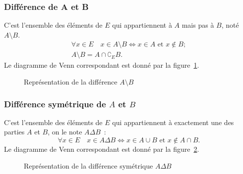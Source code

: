 \subsubsection{Différence de A et B}
\label{chap3-subsubsec:difference}
C'est l'ensemble des éléments de \(E\) qui appartiennent à \(A\) mais pas à 
\(B\), noté \(A \setminus B\).
\begin{gather}
    \forall x \in E \quad x \in A \setminus B \iff x \in A \text{~et~} x \not\in B; \\
    A \setminus B=A \cap \complement_E B.
\end{gather}
Le diagramme de Venn correspondant est donné par la figure~\ref{chap3-fig:diff}.

\begin{figure}
    \centering
    \caption{Représentation de la différence \(A \setminus B\)}
    \label{chap3-fig:diff}
\end{figure}

\subsubsection{Différence symétrique de \(A\) et \(B\)}
\label{chap3-subsubsec:differencesymetrique}
C'est l'ensemble des éléments de \(E\) qui appartiennent à exactement une des 
parties \(A\) et \(B\), on le note $A \Delta B$~:
\begin{equation}
    \forall x \in E \quad x \in A \Delta B \iff x \in A \cup B \text{~et~} x \not\in 
    A \cap B.
\end{equation}
Le diagramme de Venn correspondant est donné par la 
figure~\ref{chap3-fig:diffsym}.

\begin{figure}
    \centering
    \caption{Représentation de la différence symétrique \(A \Delta B\)}
    \label{chap3-fig:diffsym}
\end{figure}

